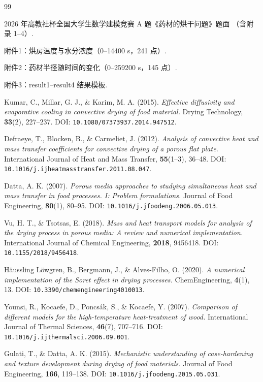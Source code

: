 \begin{thebibliography}{99}
\small

 2026 年高教社杯全国大学生数学建模竞赛 A 题《药材的烘干问题》题面
（含附录 1--4）.

 附件1：烘房温度与水分浓度（0--14400 s，241 点）.

 附件2：药材半径随时间的变化（0--259200 s，145 点）.

 附件3：result1--result4 结果模板.

 Kumar, C., Millar, G. J., \& Karim, M. A. (2015).
\emph{Effective diffusivity and evaporative cooling in convective drying of
food material.} Drying Technology, \textbf{33}(2), 227--237.
DOI: \texttt{10.1080/07373937.2014.947512}.

 Defraeye, T., Blocken, B., \& Carmeliet, J. (2012).
\emph{Analysis of convective heat and mass transfer coefficients for convective
drying of a porous flat plate.} International Journal of Heat and Mass Transfer,
\textbf{55}(1--3), 36--48.
DOI: \texttt{10.1016/j.ijheatmasstransfer.2011.08.047}.

 Datta, A. K. (2007).
\emph{Porous media approaches to studying simultaneous heat and mass transfer in
food processes. I: Problem formulations.} Journal of Food Engineering,
\textbf{80}(1), 80--95. DOI: \texttt{10.1016/j.jfoodeng.2006.05.013}.

 Vu, H. T., \& Tsotsas, E. (2018).
\emph{Mass and heat transport models for analysis of the drying process in
porous media: A review and numerical implementation.}
International Journal of Chemical Engineering, \textbf{2018}, 9456418.
DOI: \texttt{10.1155/2018/9456418}.

 H\"aussling L\"owgren, B., Bergmann, J., \& Alves-Filho, O. (2020).
\emph{A numerical implementation of the Soret effect in drying processes.}
ChemEngineering, \textbf{4}(1), 13.
DOI: \texttt{10.3390/chemengineering4010013}.

 Younsi, R., Kocaefe, D., Poncs\'ak, S., \& Kocaefe, Y. (2007).
\emph{Comparison of different models for the high-temperature heat-treatment of
wood.} International Journal of Thermal Sciences, \textbf{46}(7), 707--716.
DOI: \texttt{10.1016/j.ijthermalsci.2006.09.001}.

 Gulati, T., \& Datta, A. K. (2015).
\emph{Mechanistic understanding of case-hardening and texture development during
drying of food materials.} Journal of Food Engineering, \textbf{166}, 119--138.
DOI: \texttt{10.1016/j.jfoodeng.2015.05.031}.


\end{thebibliography}
